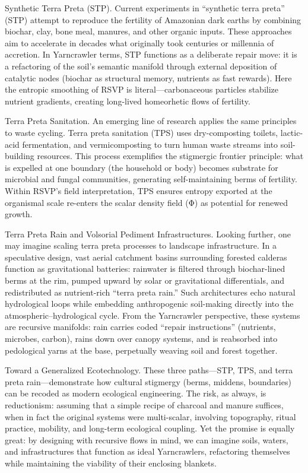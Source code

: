 \documentclass{article}
\begin{document}
Synthetic Terra Preta (STP).
Current experiments in “synthetic terra preta” (STP) attempt to reproduce the fertility of Amazonian dark earths by combining biochar, clay, bone meal, manures, and other organic inputs. These approaches aim to accelerate in decades what originally took centuries or millennia of accretion. In Yarncrawler terms, STP functions as a deliberate repair move: it is a refactoring of the soil’s semantic manifold through external deposition of catalytic nodes (biochar as structural memory, nutrients as fast rewards). Here the entropic smoothing of RSVP is literal—carbonaceous particles stabilize nutrient gradients, creating long-lived homeorhetic flows of fertility.

Terra Preta Sanitation.
An emerging line of research applies the same principles to waste cycling. Terra preta sanitation (TPS) uses dry-composting toilets, lactic-acid fermentation, and vermicomposting to turn human waste streams into soil-building resources. This process exemplifies the stigmergic frontier principle: what is expelled at one boundary (the household or body) becomes substrate for microbial and fungal communities, generating self-maintaining berms of fertility. Within RSVP’s field interpretation, TPS ensures entropy exported at the organismal scale re-enters the scalar density field (Φ) as potential for renewed growth.

Terra Preta Rain and Volsorial Pediment Infrastructures.
Looking further, one may imagine scaling terra preta processes to landscape infrastructure. In a speculative design, vast aerial catchment basins surrounding forested calderas function as gravitational batteries: rainwater is filtered through biochar-lined berms at the rim, pumped upward by solar or gravitational differentials, and redistributed as nutrient-rich “terra preta rain.” Such architectures echo natural hydrological loops while embedding anthropogenic soil-making directly into the atmospheric–hydrological cycle. From the Yarncrawler perspective, these systems are recursive manifolds: rain carries coded “repair instructions” (nutrients, microbes, carbon), rains down over canopy systems, and is reabsorbed into pedological yarns at the base, perpetually weaving soil and forest together.

Toward a Generalized Ecotechnology.
These three paths—STP, TPS, and terra preta rain—demonstrate how cultural stigmergy (berms, middens, boundaries) can be recoded as modern ecological engineering. The risk, as always, is reductionism: assuming that a simple recipe of charcoal and manure suffices, when in fact the original systems were multi-scalar, involving topography, ritual practice, mobility, and long-term ecological coupling. Yet the promise is equally great: by designing with recursive flows in mind, we can imagine soils, waters, and infrastructures that function as ideal Yarncrawlers, refactoring themselves while maintaining the viability of their enclosing blankets.
\end{document}
